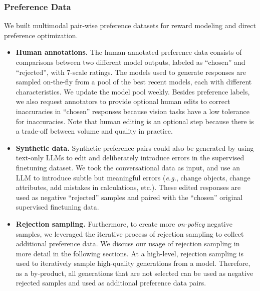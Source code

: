 \documentclass[dvipsnames]{fairmeta}
\begin{document}
\subsubsection{Preference Data}
\label{subsubsection:vision_preference_data}
We built multimodal pair-wise preference datasets for reward modeling and direct preference optimization.
\begin{itemize}

\item \textbf{Human annotations.} The human-annotated preference data consists of comparisons between two different model outputs, labeled as ``chosen'' and ``rejected'', with 7-scale ratings. The models used to generate responses are sampled on-the-fly from a pool of the best recent models, each with different characteristics. We update the model pool weekly. Besides preference labels, we also request annotators to provide optional human edits to correct inaccuracies in ``chosen'' responses because vision tasks have a low tolerance for inaccuracies. Note that human editing is an optional step because there is a trade-off between volume and quality in practice.

\item \textbf{Synthetic data.} Synthetic preference pairs could also be generated by using text-only LLMs to edit and deliberately introduce errors in the supervised finetuning dataset. We took the conversational data as input, and use an LLM to introduce subtle but meaningful errors (\textit{e.g.}, change objects, change attributes, add mistakes in calculations, etc.). These edited responses are used as negative ``rejected'' samples and paired with the ``chosen'' original supervised finetuning data.

\item \textbf{Rejection sampling.} Furthermore, to create more \emph{on-policy} negative samples, we leveraged the iterative process of rejection sampling to collect additional preference data. We discuss our usage of rejection sampling in more detail in the following sections. At a high-level, rejection sampling is used to iteratively sample high-quality generations from a model. Therefore, as a by-product, all generations that are not selected can be used as negative rejected samples and used as additional preference data pairs.

\end{itemize}
\end{document}
